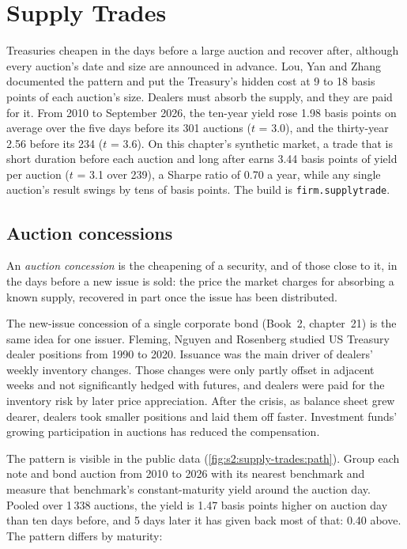 \chapter{Supply Trades}\label{ch:s2:supply-trades}

Treasuries cheapen in the days before a large auction and recover after, although every auction's date and size are announced in advance. Lou, Yan
and Zhang documented the pattern and put the Treasury's hidden cost at 9 to 18 basis points of each auction's size. Dealers must absorb the supply,
and they are paid for it. From 2010 to September 2026, the ten-year yield rose 1.98 basis points on average over the five days before its 301 auctions
($t$ = 3.0), and the thirty-year 2.56 before its 234 ($t$ = 3.6). On this chapter's synthetic market, a trade that is short duration before each
auction and long after earns 3.44 basis points of yield per auction ($t$ = 3.1 over 239), a Sharpe ratio of 0.70 a year, while any single auction's
result swings by tens of basis points. The build is \texttt{firm.supplytrade}.

\section{Auction concessions}

\begin{definition}\label{def:s2:supply-trades:concession}
An \emph{auction concession} is the cheapening of a security, and of those close to it, in the days before a new issue is
sold: the price the market charges for absorbing a known supply, recovered in part once the issue has been distributed.
\end{definition}

The new-issue concession of a single corporate bond (Book~2, chapter~21) is the same idea for one issuer. Fleming, Nguyen and Rosenberg studied US
Treasury dealer positions from 1990 to 2020. Issuance was the main driver of dealers' weekly inventory changes. Those changes were only partly offset
in adjacent weeks and not significantly hedged with futures, and dealers were paid for the inventory risk by later price appreciation. After the
crisis, as balance sheet grew dearer, dealers took smaller positions and laid them off faster. Investment funds' growing participation in auctions
has reduced the compensation.

The pattern is visible in the public data (\cref{fig:s2:supply-trades:path}). Group each note and bond auction from 2010 to 2026 with its nearest
benchmark and measure that benchmark's constant-maturity yield around the auction day. Pooled over 1\,338 auctions, the yield is 1.47 basis points
higher on auction day than ten days before, and 5 days later it has given back most of that: 0.40 above. The pattern differs by maturity:

